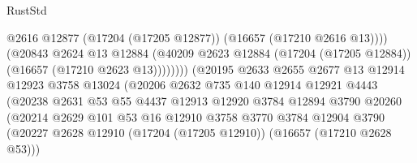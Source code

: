 \begin{lexlean}{RustStd}
\begin{coremodule}
                                            @2616
                                            @12877
                                            (@17204 (@17205 @12877))
                                            (@16657 (@17210 @2616 @13))))
                                        (@20843
                                          @2624
                                          @13
                                          @12884
                                          (@40209
                                            @2623
                                            @12884
                                            (@17204 (@17205 @12884))
                                            (@16657 (@17210 @2623 @13))))))))
                                (@20195
                                  @2633
                                  @2655
                                  @2677
                                  @13
                                  @12914
                                  @12923
                                  @3758
                                  @13024
                                  (@20206
                                    @2632
                                    @735
                                    @140
                                    @12914
                                    @12921
                                    @4443
                                    (@20238
                                      @2631
                                      @53
                                      @55
                                      @4437
                                      @12913
                                      @12920
                                      @3784
                                      @12894
                                      @3790
                                      @20260
                                      (@20214
                                        @2629
                                        @101
                                        @53
                                        @16
                                        @12910
                                        @3758
                                        @3770
                                        @3784
                                        @12904
                                        @3790
                                        (@20227
                                          @2628
                                          @12910
                                          (@17204 (@17205 @12910))
                                          (@16657 (@17210 @2628 @53)))

\end{coremodule}
\end{lexlean}
